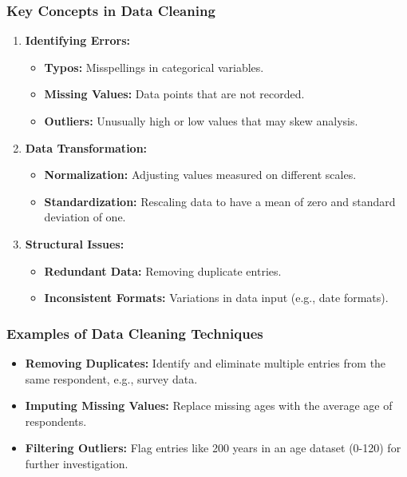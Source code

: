 \documentclass[aspectratio=169]{beamer}
\begin{document}
\begin{frame}[fragile]
    \frametitle{Key Concepts in Data Cleaning}
    \begin{enumerate}
        \item \textbf{Identifying Errors:}
            \begin{itemize}
                \item \textbf{Typos:} Misspellings in categorical variables.
                \item \textbf{Missing Values:} Data points that are not recorded.
                \item \textbf{Outliers:} Unusually high or low values that may skew analysis.
            \end{itemize}
        \item \textbf{Data Transformation:}
            \begin{itemize}
                \item \textbf{Normalization:} Adjusting values measured on different scales.
                \item \textbf{Standardization:} Rescaling data to have a mean of zero and standard deviation of one.
            \end{itemize}
        \item \textbf{Structural Issues:}
            \begin{itemize}
                \item \textbf{Redundant Data:} Removing duplicate entries.
                \item \textbf{Inconsistent Formats:} Variations in data input (e.g., date formats).
            \end{itemize}
    \end{enumerate}
\end{frame}

\begin{frame}[fragile]
    \frametitle{Examples of Data Cleaning Techniques}
    \begin{itemize}
        \item \textbf{Removing Duplicates:} Identify and eliminate multiple entries from the same respondent, e.g., survey data.
        \item \textbf{Imputing Missing Values:} Replace missing ages with the average age of respondents.
        \item \textbf{Filtering Outliers:} Flag entries like 200 years in an age dataset (0-120) for further investigation.
    \end{itemize}
\end{frame}
\end{document}

